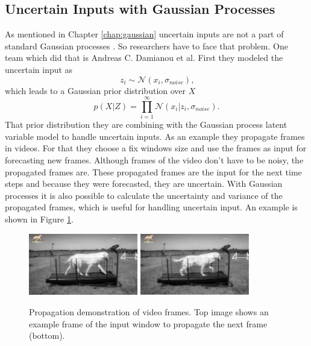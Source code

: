 \subsection{Uncertain Inputs with Gaussian Processes}
\label{chap:uncertain_inputs}
As mentioned in Chapter \ref{chap:gaussian} uncertain inputs are not a part of standard Gaussian processes
\cite{damianou_variational_2014}. So researchers have to face that problem. One team which did that is 
Andreas C. Damianou et al. First they modeled the uncertain input as
$$
z_i \sim \mathcal{N}(x_i, \sigma_{noise})\text{,}
$$
which leads to a Gaussian prior distribution over $X$
$$
p(X|Z) = \prod_{i=1}^{\infty} \mathcal{N}(x_i| z_i, \sigma_{noise})\text{.}
$$
That prior distribution they are combining with the Gaussian process latent variable model to handle
uncertain inputs. As an example they propagate frames in videos. For that they choose a 
fix windows size and use the frames as input for forecasting new frames. Although frames
of the video don't have to be noisy, the propagated frames are. These propagated frames are the input 
for the next time steps and because they were forecasted, they are uncertain. With Gaussian processes 
it is also possible to calculate the uncertainty and variance of the propagated frames, which is useful 
for handling uncertain input. An example is shown in Figure \ref{fig:damianou_example}.

\begin{figure}[h!]
	\centering
	\includegraphics[width=0.425\textwidth]{images/damianou_example_1.png}
	\includegraphics[width=0.425\textwidth]{images/damianou_example_2.png}
	\caption{
		Propagation demonstration of video frames. Top image shows an example
		frame of the input window to propagate the next frame (bottom). 
        }
	\label{fig:damianou_example}
\end{figure}